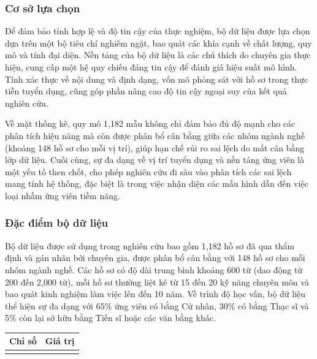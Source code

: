 \documentclass{article}
\begin{document}
\begin{itemize}[topsep=0pt, itemsep=4pt, leftmargin=40pt]
\subsubsection{Cơ sở lựa chọn}
Để đảm bảo tính hợp lệ và độ tin cậy của thực nghiệm, bộ dữ liệu được lựa chọn dựa trên một bộ tiêu chí nghiêm ngặt, bao quát các khía cạnh về chất lượng, quy mô và tính đại diện. Nền tảng của bộ dữ liệu là các chú thích do chuyên gia thực hiện, cung cấp một hệ quy chiếu đáng tin cậy để đánh giá hiệu suất mô hình. Tính xác thực về nội dung và định dạng, vốn mô phỏng sát với hồ sơ trong thực tiễn tuyển dụng, cũng góp phần nâng cao độ tin cậy ngoại suy của kết quả nghiên cứu.

Về mặt thống kê, quy mô 1,182 mẫu không chỉ đảm bảo đủ độ mạnh cho các phân tích hiệu năng mà còn được phân bổ cân bằng giữa các nhóm ngành nghề (khoảng 148 hồ sơ cho mỗi vị trí), giúp hạn chế rủi ro sai lệch do mất cân bằng lớp dữ liệu. Cuối cùng, sự đa dạng về vị trí tuyển dụng và nền tảng ứng viên là một yếu tố then chốt, cho phép nghiên cứu đi sâu vào phân tích các sai lệch mang tính hệ thống, đặc biệt là trong việc nhận diện các mẫu hình dẫn đến việc loại nhầm ứng viên tiềm năng.

\subsubsection{Đặc điểm bộ dữ liệu}
Bộ dữ liệu được sử dụng trong nghiên cứu bao gồm 1,182 hồ sơ đã qua thẩm định và gán nhãn bởi chuyên gia, được phân bổ cân bằng với 148 hồ sơ cho mỗi nhóm ngành nghề. Các hồ sơ có độ dài trung bình khoảng 600 từ (dao động từ 200 đến 2,000 từ), mỗi hồ sơ thường liệt kê từ 15 đến 20 kỹ năng chuyên môn và bao quát kinh nghiệm làm việc lên đến 10 năm. Về trình độ học vấn, bộ dữ liệu thể hiện sự đa dạng với 65\% ứng viên có bằng Cử nhân, 30\% có bằng Thạc sĩ và 5\% còn lại sở hữu bằng Tiến sĩ hoặc các văn bằng khác.

\begin{longtable}{|
  >{\raggedright\arraybackslash}p{}|
  >{\raggedright\arraybackslash}p{}|}
  \hline
  \textbf{Chỉ số} & 
  \textbf{Giá trị} \\
  \hline
  \endfirsthead

  \endhead

  \hline
  \endfoot


\end{longtable}
\end{itemize}
\end{document}
